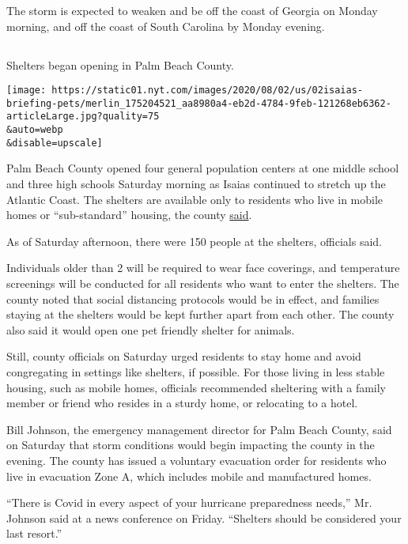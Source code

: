 The storm is expected to weaken and be off the coast of Georgia on
Monday morning, and off the coast of South Carolina by Monday evening.

\hypertarget{-1}{%
\subsection{}\label{-1}}

Shelters began opening in Palm Beach County.

\texttt{[image: https://static01.nyt.com/images/2020/08/02/us/02isaias-briefing-pets/merlin\_175204521\_aa8980a4-eb2d-4784-9feb-121268eb6362-articleLarge.jpg?quality=75\\\&auto=webp\\\&disable=upscale]}

Palm Beach County opened four general population centers at one middle
school and three high schools Saturday morning as Isaias continued to
stretch up the Atlantic Coast. The shelters are available only to
residents who live in mobile homes or ``sub-standard'' housing, the
county
\href{https://discover.pbcgov.org/Lists/Newsroom/NewsDispForm.aspx?ID=3014}{said}.

As of Saturday afternoon, there were 150 people at the shelters,
officials said.

Individuals older than 2 will be required to wear face coverings, and
temperature screenings will be conducted for all residents who want to
enter the shelters. The county noted that social distancing protocols
would be in effect, and families staying at the shelters would be kept
further apart from each other. The county also said it would open one
pet friendly shelter for animals.

Still, county officials on Saturday urged residents to stay home and
avoid congregating in settings like shelters, if possible. For those
living in less stable housing, such as mobile homes, officials
recommended sheltering with a family member or friend who resides in a
sturdy home, or relocating to a hotel.

Bill Johnson, the emergency management director for Palm Beach County,
said on Saturday that storm conditions would begin impacting the county
in the evening. The county has issued a voluntary evacuation order for
residents who live in evacuation Zone A, which includes mobile and
manufactured homes.

``There is Covid in every aspect of your hurricane preparedness needs,''
Mr. Johnson said at a news conference on Friday. ``Shelters should be
considered your last resort.''

